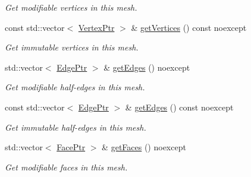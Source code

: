 \begin{DoxyCompactItemize}
\begin{DoxyCompactList}\small\item\em Get modifiable vertices in this mesh. \end{DoxyCompactList}\item 
\mbox{\label{classDcel_1_1MeshT_a579860225cb9fc926fea4856563bef08}} 
const std\+::vector$<$ \hyperlink{classDcel_1_1MeshT_a1e0abeadcb51e679b0dd9a36e2ee08c7}{Vertex\+Ptr} $>$ \& \hyperlink{classDcel_1_1MeshT_a579860225cb9fc926fea4856563bef08}{get\+Vertices} () const noexcept
\begin{DoxyCompactList}\small\item\em Get immutable vertices in this mesh. \end{DoxyCompactList}\item 
\mbox{\label{classDcel_1_1MeshT_a3c6566eab929cc4108213959fa25777e}} 
std\+::vector$<$ \hyperlink{classDcel_1_1MeshT_ab2b035530536a8bc56e40aab455f24e3}{Edge\+Ptr} $>$ \& \hyperlink{classDcel_1_1MeshT_a3c6566eab929cc4108213959fa25777e}{get\+Edges} () noexcept
\begin{DoxyCompactList}\small\item\em Get modifiable half-\/edges in this mesh. \end{DoxyCompactList}\item 
\mbox{\label{classDcel_1_1MeshT_a3440c0836148040bfd6cc679f047ec5b}} 
const std\+::vector$<$ \hyperlink{classDcel_1_1MeshT_ab2b035530536a8bc56e40aab455f24e3}{Edge\+Ptr} $>$ \& \hyperlink{classDcel_1_1MeshT_a3440c0836148040bfd6cc679f047ec5b}{get\+Edges} () const noexcept
\begin{DoxyCompactList}\small\item\em Get immutable half-\/edges in this mesh. \end{DoxyCompactList}\item 
\mbox{\label{classDcel_1_1MeshT_a348cffec1fa223f131819abad1c89338}} 
std\+::vector$<$ \hyperlink{classDcel_1_1MeshT_a6c71642a9e6b36f9d6ab6027035625f0}{Face\+Ptr} $>$ \& \hyperlink{classDcel_1_1MeshT_a348cffec1fa223f131819abad1c89338}{get\+Faces} () noexcept
\begin{DoxyCompactList}\small\item\em Get modifiable faces in this mesh. \end{DoxyCompactList}\item 

\end{DoxyCompactItemize}
